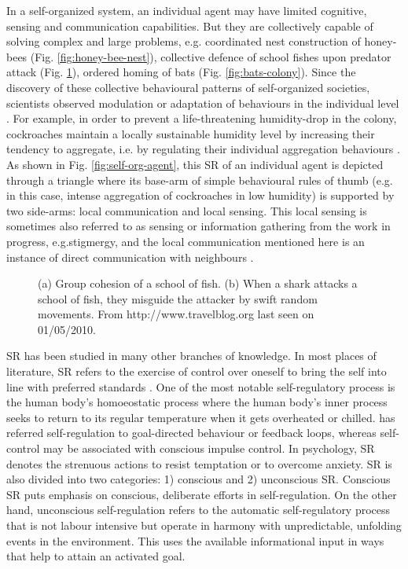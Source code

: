 % 
In a self-organized system, an individual agent may have limited cognitive, sensing and communication capabilities. But they are collectively capable of solving complex and large problems, e.g. coordinated nest construction of honey-bees (Fig. \ref{fig:honey-bee-nest}), collective defence of school fishes upon predator attack (Fig. \ref{fig:school-of-fish}), ordered homing of bats (Fig. \ref{fig:bats-colony}).  Since the discovery of these collective behavioural patterns of self-organized societies, scientists observed modulation or adaptation of behaviours in the individual level \cite{Garnier+2007}. For example, in order to prevent a life-threatening humidity-drop in the colony, cockroaches maintain a locally sustainable humidity level by increasing their tendency to aggregate, i.e. by regulating their individual aggregation behaviours . As shown in Fig. \ref{fig:self-org-agent}, this  \acf{SR} of an individual agent is depicted through a triangle where its base-arm of simple behavioural rules of thumb (e.g. in this case, intense aggregation of cockroaches in low humidity) is supported by two side-arms: local communication and local sensing. This local sensing is sometimes also referred to as sensing or information gathering from the work in progress, e.g.stigmergy, and the local communication mentioned here is an instance of direct communication with neighbours  \cite{Camazine+2001}.\\
\begin{figure}[htp]
\centering
{} 
\hspace{0.25cm}
\caption{(a) Group cohesion of a school of fish. (b) When a shark attacks a school of fish, they misguide the attacker by swift random movements. From http://www.travelblog.org last seen on 01/05/2010.}
\label{fig:school-of-fish}
\end{figure}
SR has been studied in many other branches of knowledge. In most places of literature, SR refers to the exercise of control over oneself to bring the self into line with preferred standards \cite{Baumeister+2007}. One of the most notable self-regulatory process is the human body's homoeostatic process where the human body's inner process seeks to return to its regular temperature when it gets overheated or chilled.  has referred self-regulation to goal-directed behaviour or feedback loops, whereas self-control may be associated with conscious impulse control.  In psychology, SR denotes the strenuous actions to resist temptation or to overcome anxiety. SR is also divided into two categories: 1) conscious and 2) unconscious SR. Conscious SR puts emphasis on conscious, deliberate efforts in self-regulation. On the other hand, unconscious self-regulation refers to the automatic self-regulatory process that is not labour intensive but operate in harmony with unpredictable, unfolding events in the environment. This uses the available informational input in ways that help to attain an activated goal.\\
